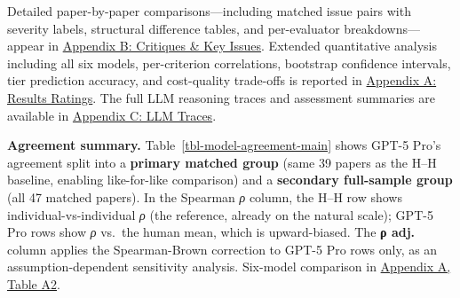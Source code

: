 \documentclass[
  11pt,
  letterpaper,
]{article}
\begin{document}
Detailed paper-by-paper comparisons---including matched issue pairs with
severity labels, structural difference tables, and per-evaluator
breakdowns---appear in \href{results_critiques.qmd}{Appendix B:
Critiques \& Key Issues}. Extended quantitative analysis including all
six models, per-criterion correlations, bootstrap confidence intervals,
tier prediction accuracy, and cost-quality trade-offs is reported in
\href{results_ratings.qmd}{Appendix A: Results Ratings}. The full LLM
reasoning traces and assessment summaries are available in
\href{appendix_llm_traces.qmd}{Appendix C: LLM Traces}.

\textbf{Agreement summary.} Table~\ref{tbl-model-agreement-main} shows
GPT-5 Pro's agreement split into a \textbf{primary matched group} (same
39 papers as the H--H baseline, enabling like-for-like comparison) and a
\textbf{secondary full-sample group} (all 47 matched papers). In the
Spearman \emph{ρ} column, the H--H row shows individual-vs-individual
\emph{ρ} (the reference, already on the natural scale); GPT-5 Pro rows
show \emph{ρ} vs.~the human mean, which is upward-biased. The \textbf{ρ
adj.} column applies the Spearman-Brown correction to GPT-5 Pro rows
only, as an assumption-dependent sensitivity analysis. Six-model
comparison in \hyperref[tbl-agreement]{Appendix A, Table A2}.
\end{document}
